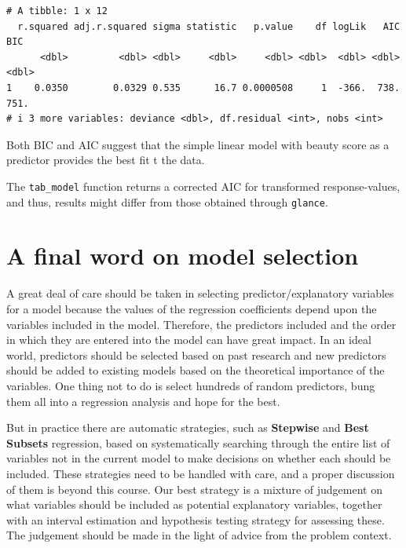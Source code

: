 \documentclass[
  letterpaper,
  DIV=11,
  numbers=noendperiod]{scrartcl}
\begin{document}
\begin{verbatim}
# A tibble: 1 x 12
  r.squared adj.r.squared sigma statistic   p.value    df logLik   AIC   BIC
      <dbl>         <dbl> <dbl>     <dbl>     <dbl> <dbl>  <dbl> <dbl> <dbl>
1    0.0350        0.0329 0.535      16.7 0.0000508     1  -366.  738.  751.
# i 3 more variables: deviance <dbl>, df.residual <int>, nobs <int>
\end{verbatim}

Both BIC and AIC suggest that the simple linear model with beauty score
as a predictor provides the best fit t the data.

\begin{tcolorbox}[enhanced jigsaw, coltitle=black, bottomtitle=1mm, arc=.35mm, colframe=quarto-callout-note-color-frame, left=2mm, opacityback=0, colback=white, title=\textcolor{quarto-callout-note-color}{\faInfo}\hspace{0.5em}{Note}, toptitle=1mm, titlerule=0mm, breakable, rightrule=.15mm, bottomrule=.15mm, toprule=.15mm, colbacktitle=quarto-callout-note-color!10!white, leftrule=.75mm, opacitybacktitle=0.6]

The \texttt{tab\_model} function returns a corrected AIC for transformed
response-values, and thus, results might differ from those obtained
through \texttt{glance}.

\end{tcolorbox}

\section{A final word on model
selection}\label{a-final-word-on-model-selection}

A great deal of care should be taken in selecting predictor/explanatory
variables for a model because the values of the regression coefficients
depend upon the variables included in the model. Therefore, the
predictors included and the order in which they are entered into the
model can have great impact. In an ideal world, predictors should be
selected based on past research and new predictors should be added to
existing models based on the theoretical importance of the variables.
One thing not to do is select hundreds of random predictors, bung them
all into a regression analysis and hope for the best.

But in practice there are automatic strategies, such as
\textbf{Stepwise} and \textbf{Best Subsets} regression, based on
systematically searching through the entire list of variables not in the
current model to make decisions on whether each should be included.
These strategies need to be handled with care, and a proper discussion
of them is beyond this course. Our best strategy is a mixture of
judgement on what variables should be included as potential explanatory
variables, together with an interval estimation and hypothesis testing
strategy for assessing these. The judgement should be made in the light
of advice from the problem context.
\end{document}
